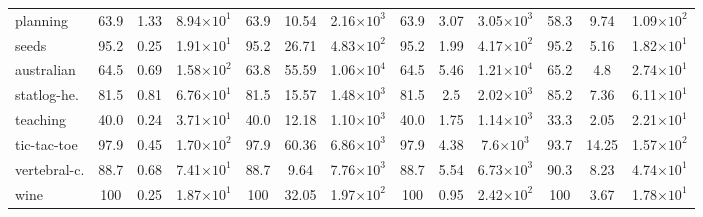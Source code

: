 \begin{table}[t]
\begin{small}
\begin{tabular}{lcccccccccccc}
			planning       & 63.9                                 & 1.33                                 & 8.94{\tiny \(\times 10^{1}\)}     & 63.9                            & 10.54  & 2.16{\tiny \(\times 10^{3}\)} & 63.9 & 3.07 & 3.05{\tiny \(\times 10^{3}\)}  & 58.3 & 9.74  & 1.09{\tiny \(\times 10^{2}\)} \\
			seeds          & 95.2                                 & 0.25                                 & 1.91{\tiny \(\times 10^{1}\)}     & 95.2                            & 26.71  & 4.83{\tiny \(\times 10^{2}\)} & 95.2 & 1.99 & 4.17{\tiny \(\times 10^{2}\)}  & 95.2 & 5.16  & 1.82{\tiny \(\times 10^{1}\)} \\
			australian     & 64.5                                 & 0.69                                 & 1.58{\tiny \(\times 10^{2}\)}     & 63.8                            & 55.59  & 1.06{\tiny \(\times 10^{4}\)} & 64.5 & 5.46 & 1.21{\tiny \(\times 10^{4}\)}  & 65.2 & 4.8   & 2.74{\tiny \(\times 10^{1}\)} \\
			statlog-he.  & 81.5                                 & 0.81                                 & 6.76{\tiny \(\times 10^{1}\)}     & 81.5                            & 15.57  & 1.48{\tiny \(\times 10^{3}\)} & 81.5 & 2.5  & 2.02{\tiny \(\times 10^{3 }\)} & 85.2 & 7.36  & 6.11{\tiny \(\times 10^{1}\)} \\
			teaching       & 40.0                                 & 0.24                                 & 3.71{\tiny \(\times 10^{1}\)}     & 40.0                            & 12.18  & 1.10{\tiny \(\times 10^{3}\)} & 40.0 & 1.75 & 1.14{\tiny \(\times 10^{3}\)}  & 33.3 & 2.05  & 2.21{\tiny \(\times 10^{1}\)} \\
			tic-tac-toe    & 97.9                                 & 0.45                                 & 1.70{\tiny \(\times 10^{2}\)}     & 97.9                            & 60.36  & 6.86{\tiny \(\times 10^{3}\)} & 97.9 & 4.38 & 7.6{\tiny \(\times 10^{3}\)}   & 93.7 & 14.25 & 1.57{\tiny \(\times 10^{2}\)} \\
			vertebral-c. & 88.7                                 & 0.68                                 & 7.41{\tiny \(\times 10^{1}\)}     & 88.7                            & 9.64   & 7.76{\tiny \(\times 10^{3}\)} & 88.7 & 5.54 & 6.73{\tiny \(\times 10^{3}\)}  & 90.3 & 8.23  & 4.74{\tiny \(\times 10^{1}\)} \\
			wine           & 100                                  & 0.25                                 & 1.87{\tiny \(\times 10^{1}\)}     & 100                             & 32.05  & 1.97{\tiny \(\times 10^{2}\)} & 100  & 0.95 & 2.42{\tiny \(\times 10^{2}\)}  & 100  & 3.67  & 1.78{\tiny \(\times 10^{1}\)} \\ \bottomrule
		\end{tabular}
	\end{small}
\end{table}

\setlength{\tabcolsep}{6pt}
